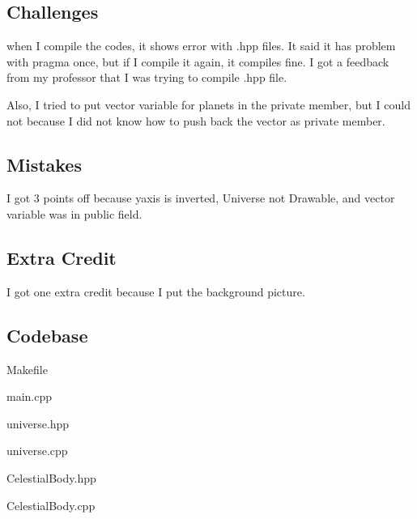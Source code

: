 \subsection{Challenges}\label{sec:ps3a:challenges}
when I compile the codes, it shows error with .hpp files. It said it has problem with pragma once, but if I compile it again, it compiles fine. 
I got a feedback from my professor that I was trying to compile .hpp file.

Also, I tried to put vector variable for planets in the private member, but I could not because I did not know how to push back the vector as private member.

\subsection{Mistakes}\label{sec:ps3a:Mistakes}

I got 3 points off because yaxis is inverted, Universe not Drawable, and vector variable was in public field.

\subsection{Extra Credit}\label{sec:ps3a:Extra Credit}

I got one extra credit because I put the background picture.

\subsection{Codebase}\label{sec:ps3a:code}
Makefile

main.cpp

universe.hpp

universe.cpp

CelestialBody.hpp

CelestialBody.cpp


\newpage
